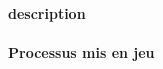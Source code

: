 \paragraph{description} %
\label{par:description_whitefly}
\cite{brumin2011}

\paragraph{Processus mis en jeu} %
\label{par:process_whitefly}

